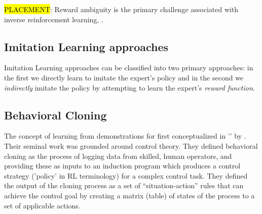 \documentclass{article}
\newcommand{\hlc}[2][blue!10]{{\colorlet{foo}{#1} \sethlcolor{foo}\hl{#2}}}
\begin{document}
\hlc{PLACEMENT}: Reward ambiguity is the primary challenge associated with inverse reinforcement learning, \citep{ng2000algorithms, stanford-lectures, baheri2023}.


\subsection{Imitation Learning approaches} 

Imitation Learning approaches can be classified into two primary approaches: in the first we directly learn to imitate the expert's policy and in the second we \textit{indirectly} imitate the policy by attempting to learn the expert's \textit{reward function}. 


\subsection{Behavioral Cloning}

The concept of learning from demonstrations for first conceptualized in '' by \cite{BC-bain1995}. Their seminal work was grounded around control theory. They defined behavioral cloning as the process of logging data from skilled, human operators, and providing these as inputs to an induction program which produces a control strategy ('policy' in RL terminology) for a complex control task. They defined the output of the cloning process as a set of ``situation-action'' rules that can achieve the control goal by creating a matrix (table) of states of the process to a set of applicable actions.
\end{document}
